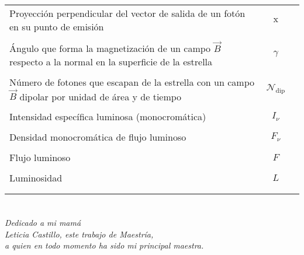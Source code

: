 \documentclass[letterpaper, twoside,openright]{book}
\newcommand{\x}{\text{x}}
\begin{document}
\begin{table}[h]
\begin{tabular}{lcc}
		Proyección perpendicular del vector de salida de un fotón en su punto de emisión & $\x$ & \\&& \\
		Ángulo que forma la magnetización de un campo $\vec{B}$ respecto a la normal en la superficie de la estrella & $\gamma$ & \\&& \\
		Número de fotones que escapan de la estrella con un campo $\vec{B}$ dipolar por unidad de área y de tiempo & $\mathcal{N}_\text{dip}$ &\\ &&\\
		Intensidad específica luminosa (monocromática) & $I_\nu$ & \\&& \\
		Densidad monocromática de flujo luminoso & $F_\nu$ & \\&& \\
		Flujo luminoso & $F$ & \\&& \\
		Luminosidad & $L$ & \\&& \\
		& & \\ 
		\hline
	\end{tabular}
	\label{Table:conversions}
\end{table}





\thispagestyle{empty}



\tableofcontents

\mainmatter



\thispagestyle{empty}


\chapter*{}
\begin{flushright}
\textit{Dedicado a mi mamá\\
Leticia Castillo, este trabajo de Maestría, \\
a quien en todo momento ha sido mi principal maestra.}
\end{flushright}


\label{chap:1} 


\label{chap:2} 
\end{document}
